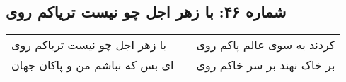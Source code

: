 \begin{center}
\section*{شماره ۴۶: با زهر اجل چو نیست تریاکم روی}
\label{sec:046}
\begin{longtable}{l p{0.5cm} r}
با زهر اجل چو نیست تریاکم روی
&&
کردند به سوی عالم پاکم روی
\\
ای بس که نباشم من و پاکان جهان
&&
بر خاک نهند بر سر خاکم روی
\\
\end{longtable}
\end{center}
